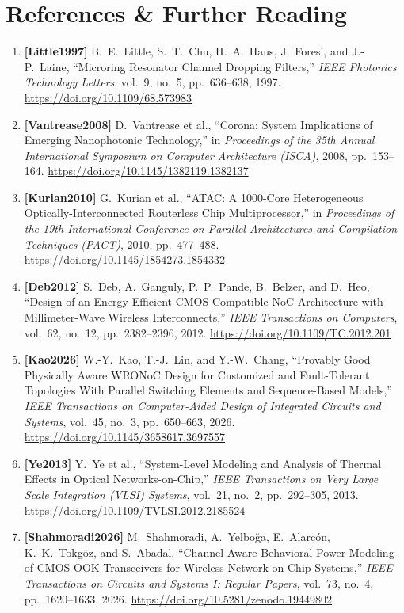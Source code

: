 \section{References \& Further Reading}
\label{sec:ch10_references}

\begin{enumerate}
    \item \textbf{[Little1997]} B.~E.~Little, S.~T.~Chu, H.~A.~Haus, J.~Foresi, and J.-P.~Laine, ``Microring Resonator Channel Dropping Filters,'' \emph{IEEE Photonics Technology Letters}, vol.~9, no.~5, pp.~636--638, 1997. \url{https://doi.org/10.1109/68.573983}
    \item \textbf{[Vantrease2008]} D.~Vantrease et al., ``Corona: System Implications of Emerging Nanophotonic Technology,'' in \emph{Proceedings of the 35th Annual International Symposium on Computer Architecture (ISCA)}, 2008, pp.~153--164. \url{https://doi.org/10.1145/1382119.1382137}
    \item \textbf{[Kurian2010]} G.~Kurian et al., ``ATAC: A 1000-Core Heterogeneous Optically-Interconnected Routerless Chip Multiprocessor,'' in \emph{Proceedings of the 19th International Conference on Parallel Architectures and Compilation Techniques (PACT)}, 2010, pp.~477--488. \url{https://doi.org/10.1145/1854273.1854332}
    \item \textbf{[Deb2012]} S.~Deb, A.~Ganguly, P.~P.~Pande, B.~Belzer, and D.~Heo, ``Design of an Energy-Efficient CMOS-Compatible NoC Architecture with Millimeter-Wave Wireless Interconnects,'' \emph{IEEE Transactions on Computers}, vol.~62, no.~12, pp.~2382--2396, 2012. \url{https://doi.org/10.1109/TC.2012.201}
    \item \textbf{[Kao2026]} W.-Y.~Kao, T.-J.~Lin, and Y.-W.~Chang, ``Provably Good Physically Aware WRONoC Design for Customized and Fault-Tolerant Topologies With Parallel Switching Elements and Sequence-Based Models,'' \emph{IEEE Transactions on Computer-Aided Design of Integrated Circuits and Systems}, vol.~45, no.~3, pp.~650--663, 2026. \url{https://doi.org/10.1145/3658617.3697557}
    \item \textbf{[Ye2013]} Y.~Ye et al., ``System-Level Modeling and Analysis of Thermal Effects in Optical Networks-on-Chip,'' \emph{IEEE Transactions on Very Large Scale Integration (VLSI) Systems}, vol.~21, no.~2, pp.~292--305, 2013. \url{https://doi.org/10.1109/TVLSI.2012.2185524}
    \item \textbf{[Shahmoradi2026]} M.~Shahmoradi, A.~Yelbo{\u{g}}a, E.~Alarc{\'o}n, K.~K.~Tokg{\"o}z, and S.~Abadal, ``Channel-Aware Behavioral Power Modeling of CMOS OOK Transceivers for Wireless Network-on-Chip Systems,'' \emph{IEEE Transactions on Circuits and Systems I: Regular Papers}, vol.~73, no.~4, pp.~1620--1633, 2026. \url{https://doi.org/10.5281/zenodo.19449802}

\end{enumerate}

